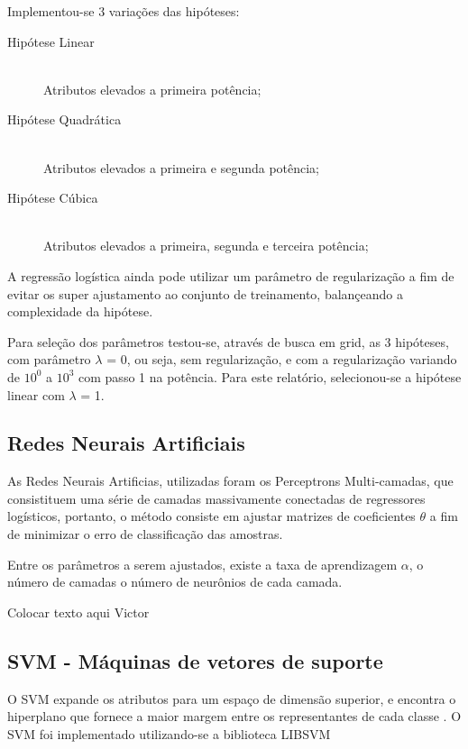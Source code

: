 Implementou-se 3 variações das hipóteses:

\begin{description}
\item[Hipótese Linear] \hfill \\ Atributos elevados a primeira potência;
\item[Hipótese Quadrática] \hfill \\ Atributos elevados a primeira e segunda potência;
\item[Hipótese Cúbica] \hfill \\ Atributos elevados a primeira, segunda e terceira potência;
\end{description}

A regressão logística ainda pode utilizar um parâmetro de regularização a fim de evitar os super ajustamento ao conjunto de treinamento, balançeando a complexidade da hipótese.

Para seleção dos parâmetros testou-se, através de busca em grid, as 3 hipóteses, com parâmetro \(\lambda\) = 0, ou seja, sem regularização, e com a regularização variando de \(10^0\) a \(10^3\) com passo 1 na potência. Para este relatório, selecionou-se a hipótese linear com \(\lambda\) = 1.

\subsection{Redes Neurais Artificiais}

As Redes Neurais Artificias, utilizadas foram os Perceptrons Multi-camadas, que consistituem uma série de camadas massivamente conectadas de regressores logísticos, portanto, o método consiste em ajustar matrizes de coeficientes \(\theta\) a fim de minimizar o erro de classificação das amostras.

Entre os parâmetros a serem ajustados, existe a taxa de aprendizagem \(\alpha\), o número de camadas o número de neurônios de cada camada.

Colocar texto aqui Victor \cite{cybenko}

\subsection{SVM - Máquinas de vetores de suporte}

O SVM expande os atributos para um espaço de dimensão superior, e encontra o hiperplano que fornece a maior margem entre os representantes de cada classe \cite{praticalSVM}. O SVM foi implementado utilizando-se a biblioteca LIBSVM \cite{libsvm}

